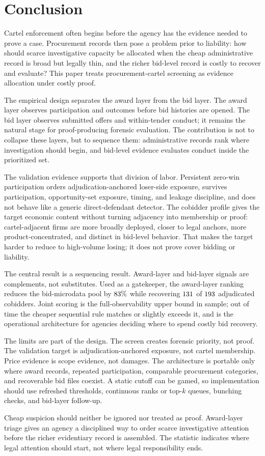 \section{Conclusion}
\label{sec:conclusion}

Cartel enforcement often begins before the agency has the
evidence needed to prove a case. Procurement records then pose a
problem prior to liability: how should scarce investigative
capacity be allocated when the cheap administrative record is
broad but legally thin, and the richer bid-level record is costly
to recover and evaluate? This paper treats procurement-cartel
screening as evidence allocation under costly proof.

The empirical design separates the award layer from the bid
layer. The award layer observes participation and outcomes before
bid histories are opened. The bid layer observes submitted offers
and within-tender conduct; it remains the natural stage for
proof-producing forensic evaluation. The contribution is not to
collapse these layers, but to sequence them: administrative
records rank where investigation should begin, and bid-level
evidence evaluates conduct inside the prioritized set.

The validation evidence supports that division of labor.
Persistent zero-win participation orders adjudication-anchored
loser-side exposure, survives participation, opportunity-set
exposure, timing, and leakage discipline, and does not behave
like a generic direct-defendant detector. The cobidder profile
gives the target economic content without turning adjacency into
membership or proof: cartel-adjacent firms are more broadly
deployed, closer to legal anchors, more product-concentrated, and
distinct in bid-level behavior. That makes the target harder to
reduce to high-volume losing; it does not prove cover bidding or
liability.

The central result is a sequencing result. Award-layer and
bid-layer signals are complements, not substitutes. Used as a
gatekeeper, the award-layer ranking reduces the bid-microdata
pool by $83\%$ while recovering
$131$ of $193$ adjudicated cobidders.
Joint scoring is the full-observability upper bound in sample;
out of time the cheaper sequential rule matches or slightly
exceeds it, and is the operational architecture for agencies
deciding where to spend costly bid recovery.

The limits are part of the design. The screen creates forensic
priority, not proof. The validation target is
adjudication-anchored exposure, not cartel membership. Price
evidence is scope evidence, not damages. The architecture is
portable only where award records, repeated participation,
comparable procurement categories, and recoverable bid files
coexist. A static cutoff can be gamed, so implementation should
use refreshed thresholds, continuous ranks or top-$k$ queues,
bunching checks, and bid-layer follow-up.

Cheap suspicion should neither be ignored nor treated as proof.
Award-layer triage gives an agency a disciplined way to order
scarce investigative attention before the richer evidentiary
record is assembled. The statistic indicates where legal
attention should start, not where legal responsibility ends.
